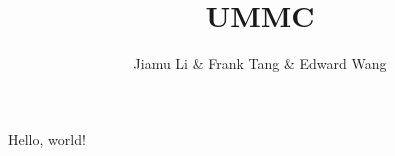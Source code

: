 \documentclass{article}
\title{UMMC}
\author{Jiamu Li \& Frank Tang \& Edward Wang}
\begin{document}
\maketitle

Hello, world!
\end{document}

